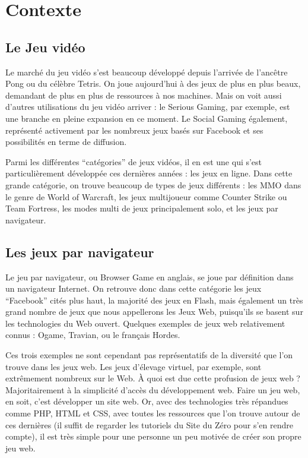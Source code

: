 \documentclass[a4paper,10pt]{report}
\begin{document}
  
  
  
  \tableofcontents

  \setlength{\parskip}{0.1in}

  \chapter{Contexte}

    \section{Le Jeu vidéo}

      Le marché du jeu vidéo s’est beaucoup développé depuis l’arrivée de l’ancêtre Pong ou du célèbre Tetris. On joue aujourd’hui à des jeux de plus en plus beaux, demandant de plus en plus de ressources à nos machines. Mais on voit aussi d’autres utilisations du jeu vidéo arriver : le Serious Gaming, par exemple, est une branche en pleine expansion en ce moment. Le Social Gaming également, représenté activement par les nombreux jeux basés sur Facebook et ses possibilités en terme de diffusion.

      Parmi les différentes ``catégories'' de jeux vidéos, il en est une qui s'est particulièrement développée ces dernières années : les jeux en ligne. Dans cette grande catégorie, on trouve beaucoup de types de jeux différents : les MMO dans le genre de World of Warcraft, les jeux multijoueur comme Counter Strike ou Team Fortress, les modes multi de jeux principalement solo, et les jeux par navigateur.

    \section{Les jeux par navigateur}

      Le jeu par navigateur, ou Browser Game en anglais, se joue par définition dans un navigateur Internet. On retrouve donc dans cette catégorie les jeux “Facebook” cités plus haut, la majorité des jeux en Flash, mais également un très grand nombre de jeux que nous appellerons les Jeux Web, puisqu’ils se basent sur les technologies du Web ouvert. Quelques exemples de jeux web relativement connus : Ogame, Travian, ou le français Hordes.

      Ces trois exemples ne sont cependant pas représentatifs de la diversité que l’on trouve dans les jeux web. Les jeux d’élevage virtuel, par exemple, sont extrêmement nombreux sur le Web. À quoi est due cette profusion de jeux web ? Majoritairement à la simplicité d’accès du développement web. Faire un jeu web, en soit, c’est développer un site web. Or, avec des technologies très répandues comme PHP, HTML et CSS, avec toutes les ressources que l’on trouve autour de ces dernières (il suffit de regarder les tutoriels du Site du Zéro pour s’en rendre compte), il est très simple pour une personne un peu motivée de créer son propre jeu web.
\end{document}
